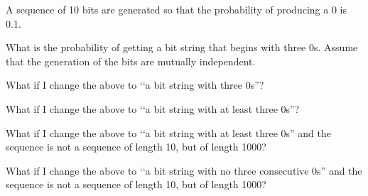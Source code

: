 A sequence of 10 bits are generated so that the probability
of producing a 0 is 0.1.
\begin{tightlist}
  \item What is the probability of getting 
  a bit string that begins with three 0s.
  Assume that the generation of the bits are
  mutually independent.
  \item What if I change the above to \lq\lq a bit string
  with three 0s''?
  \item What if I change the above to \lq\lq a bit string
  with at least three 0s''?
  \item What if I change the above to \lq\lq a bit string
  with at least three 0s'' and the sequence is not a sequence
  of length 10, but of length 1000?
  \item What if I change the above to \lq\lq a bit string
  with no three consecutive 0s'' and the sequence is not a sequence
  of length 10, but of length 1000?
\end{tightlist}
